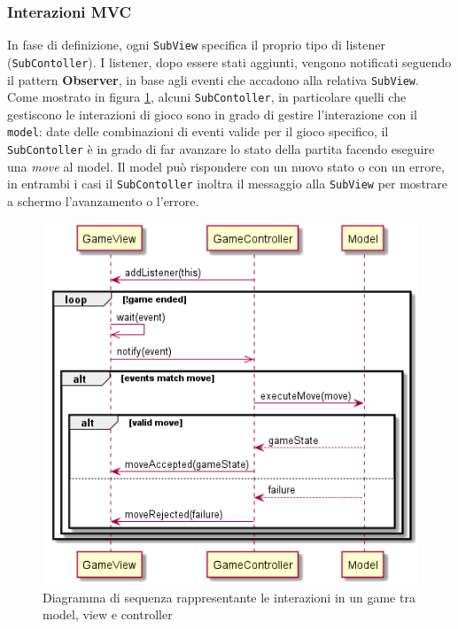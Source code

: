 \subsubsection{Interazioni MVC}
In fase di definizione, ogni \texttt{SubView} specifica il proprio tipo di listener (\texttt{SubContoller}).
%
I listener, dopo essere stati aggiunti, vengono notificati seguendo il pattern \textbf{Observer}, in base agli eventi che accadono alla relativa \texttt{SubView}.
Come mostrato in figura \ref{fig:gui_sequence}, alcuni \texttt{SubContoller}, in particolare quelli che gestiscono le interazioni di gioco sono in grado di gestire l'interazione con il \texttt{model}: date delle combinazioni di eventi valide per il gioco specifico, il \texttt{SubContoller} è in grado di far avanzare lo stato della partita facendo eseguire una \textit{move} al model.
%
Il model può rispondere con un nuovo stato o con un errore, in entrambi i casi il \texttt{SubContoller} inoltra il messaggio alla \texttt{SubView} per mostrare a schermo l'avanzamento o l'errore.
\begin{figure}
  \centering
  \includegraphics[width=\linewidth]{images/uml/gui_sequence.png}
  \caption{Diagramma di sequenza rappresentante le interazioni in un game tra model, view e controller}
  \label{fig:gui_sequence}
\end{figure}